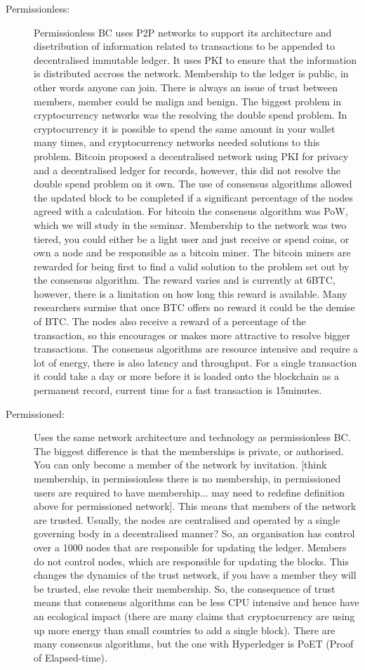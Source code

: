 \documentclass[]{article}
\begin{document}
\begin{description}
\item[Permissionless:] Permissionless BC uses P2P networks to support its architecture and disetribution of information related to transactions to be appended to decentralised immutable ledger. It uses PKI to ensure that the information is distributed accross the network. Membership to the ledger is public, in other words anyone can join. There is always an issue of trust between members, member could be malign and benign. The biggest problem in cryptocurrency networks was the resolving the double spend problem. In cryptocurrency it is possible to spend the same amount in your wallet many times, and cryptocurrency networks needed solutions to this problem. Bitcoin proposed a decentralised network using PKI for privacy and a decentralised ledger for records, however, this did not resolve the double spend problem on it own. The use of consensus algorithms allowed the updated block to be completed if a significant percentage of the nodes agreed with a calculation. For bitcoin the consensus algorithm was PoW, which we will study in the seminar. Membership to the network was two tiered, you could either be a light user and just receive or spend coins, or own a node and be responsible as a bitcoin miner. The bitcoin miners are rewarded for being first to find a valid solution to the problem set out by the consensus algorithm. The reward varies and is currently at 6BTC, however, there is a limitation on how long this reward is available. Many researchers surmise that once BTC offers no reward it could be the demise of BTC. The nodes also receive a reward of a percentage of the transaction, so this encourages or makes more attractive to resolve bigger transactions. The consensus algorithms are resource intensive and require a lot of energy, there is also latency and throughput. For a single transaction it could take a day or more before it is loaded onto the blockchain as a permanent record, current time for a fast transaction is 15minutes.
\item[Permissioned:]Uses the same network architecture and technology as permissionless BC. The biggest difference is that the memberships is private, or authorised. You can only become a member of the network by invitation. [think membership, in permissionless there is no membership, in permissioned users are required to have membership... may need to redefine definition above for permissioned network]. This means that members of the network are trusted. Usually, the nodes are centralised and operated by a single governing body in a decentralised manner? So, an organisation has control over a 1000 nodes that are responsible for updating the ledger. Members do not control nodes, which are responsible for updating the blocks. This changes the dynamics of the trust network, if you have a member they will be trusted, else revoke their membership. So, the consequence of trust means that consensus algorithms can be less CPU intensive and hence have an ecological impact (there are many claims that cryptocurrency are using up more energy than small countries to add a single block). There are many consensus algorithms, but the one with Hyperledger is PoET (Proof of Elapsed-time). 

\end{description}
\end{document}
